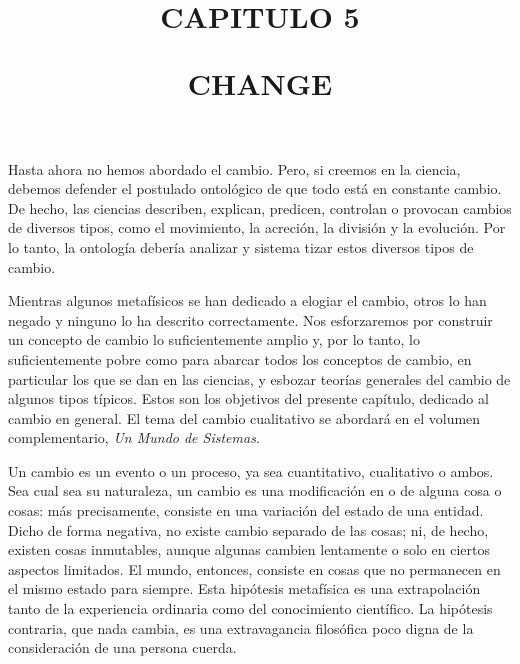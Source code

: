 \documentclass[11pt]{article}
\title{
  \normalsize CAPITULO 5
  \vspace{0.8cm}
  \begin{center}
    \large CHANGE
  \end{center}
  }
\date{}
\begin{document}
\maketitle
\vspace{-1cm}

\begin{justifying}
  \noindent 
  Hasta ahora no hemos abordado el cambio. Pero, si creemos en la ciencia, debemos defender el postulado ontológico de que todo 
  está en constante cambio. De hecho, las ciencias describen, explican, predicen, 
  controlan o provocan cambios de diversos tipos, como el movimiento, la acreción, 
  la división y la evolución. Por lo tanto, la ontología debería analizar y sistema tizar estos diversos tipos de cambio.

  Mientras algunos metafísicos se han dedicado a elogiar el cambio, otros lo han negado y ninguno lo ha descrito correctamente. Nos esforzaremos por construir un concepto de cambio lo suficientemente amplio y, por lo tanto, lo suficientemente pobre como para abarcar todos los conceptos de cambio, en particular los que se dan en las ciencias, y esbozar teorías generales del cambio de algunos tipos típicos. Estos son los objetivos del presente capítulo, dedicado al cambio en general. El tema del cambio cualitativo se abordará en el volumen complementario, \textit{Un Mundo de Sistemas}.

  Un cambio es un evento o un proceso, ya sea cuantitativo, cualitativo o ambos. Sea cual sea su naturaleza, un cambio es una modificación en o de alguna cosa o cosas: más precisamente, consiste en una variación del estado de una entidad. Dicho de forma negativa, no existe cambio separado de las cosas; ni, de hecho, existen cosas inmutables, aunque algunas cambien lentamente o solo en ciertos aspectos limitados. El mundo, entonces, consiste en cosas que no permanecen en el mismo estado para siempre. Esta hipótesis metafísica es una extrapolación tanto de la experiencia ordinaria como del conocimiento científico. La hipótesis contraria, que nada cambia, es una extravagancia filosófica poco digna de la consideración de una persona cuerda.

  
\end{justifying}










\printbibliography
\end{document}

